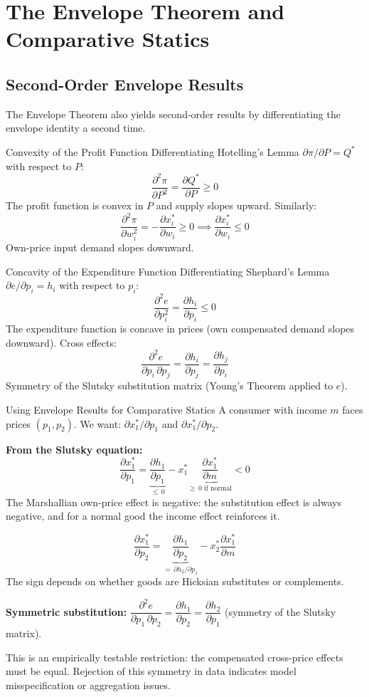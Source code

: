 \documentclass[12pt, a4paper]{article}
\theoremstyle{definition}
\newcommand{\pp}[2]{\dfrac{\partial #1}{\partial #2}}
\newcommand{\ppp}[2]{\dfrac{\partial^{2} #1}{\partial #2^{2}}}
\newcommand{\ppmix}[3]{\dfrac{\partial^{2} #1}{\partial #2\,\partial #3}}
\begin{document}
\section{The Envelope Theorem and Comparative Statics}

\subsection{Second-Order Envelope Results}

The Envelope Theorem also yields second-order results by differentiating
the envelope identity a second time.

\begin{propbox}{Convexity of the Profit Function}
Differentiating Hotelling's Lemma $\partial\pi/\partial P = Q^*$ with respect to $P$:
\[
  \ppp{\pi}{P} = \pp{Q^*}{P} \geq 0
\]
The profit function is convex in $P$ and supply slopes upward. Similarly:
\[
  \ppp{\pi}{w_i} = -\pp{x_i^*}{w_i} \geq 0
  \implies \pp{x_i^*}{w_i} \leq 0
\]
Own-price input demand slopes downward.
\end{propbox}

\begin{propbox}{Concavity of the Expenditure Function}
Differentiating Shephard's Lemma $\partial e/\partial p_i = h_i$ with respect to $p_i$:
\[
  \ppp{e}{p_i} = \pp{h_i}{p_i} \leq 0
\]
The expenditure function is concave in prices (own compensated demand slopes downward).
Cross effects:
\[
  \ppmix{e}{p_i}{p_j} = \pp{h_i}{p_j} = \pp{h_j}{p_i}
\]
Symmetry of the Slutsky substitution matrix (Young's Theorem applied to $e$).
\end{propbox}

\begin{exbox}{Using Envelope Results for Comparative Statics}
A consumer with income $m$ faces prices $(p_1,p_2)$. We want:
$\partial x_1^*/\partial p_1$ and $\partial x_1^*/\partial p_2$.

\textbf{From the Slutsky equation:}
\[
  \pp{x_1^*}{p_1}
  = \underbrace{\pp{h_1}{p_1}}_{\leq\,0}
    - x_1^*\underbrace{\pp{x_1^*}{m}}_{\geq\,0\text{ if normal}}
  < 0
\]
The Marshallian own-price effect is negative: the substitution effect is
always negative, and for a normal good the income effect reinforces it.

\[
  \pp{x_1^*}{p_2}
  = \underbrace{\pp{h_1}{p_2}}_{=\,\partial h_2/\partial p_1}
    - x_2^*\pp{x_1^*}{m}
\]
The sign depends on whether goods are Hicksian substitutes or complements.

\textbf{Symmetric substitution:}
$\ppmix{e}{p_1}{p_2} = \pp{h_1}{p_2} = \pp{h_2}{p_1}$ (symmetry of the Slutsky matrix).

This is an empirically testable restriction: the compensated cross-price effects must be equal. Rejection of this symmetry in data indicates model misspecification or aggregation issues.
\end{exbox}
\end{document}
